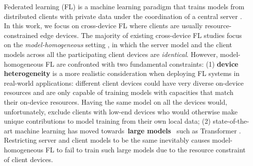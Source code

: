 \documentclass{article}
\begin{document}
Federated learning (FL) is a machine learning paradigm that trains models from distributed clients with private data under the coordination of a central server \cite{kairouz2021advances, wang2021field}. In this work, we focus on cross-device FL where clients are usually resource-constrained edge devices.
%
The majority of existing cross-device FL studies focus on the \textit{model-homogeneous} setting \cite{mcmahan2017communication, li2020federated, karimireddy2020scaffold, chen2020fedbe}, in which the server model and the client models across all the participating client devices are \textit{identical}. 
However, model-homogeneous FL are confronted with two fundamental constraints:
%
(1) \textbf{device heterogeneity} is a more realistic consideration when deploying FL systems in real-world applications: different client devices could have very diverse on-device resources and are only capable of training models with capacities that match their on-device resources. Having the same model on all the devices would, unfortunately, exclude clients with low-end devices who would otherwise make unique contributions to model training from their own local data;
%
(2) state-of-the-art machine learning has moved towards~\textbf{large models}~\cite{bommasani2021opportunities} such as Transformer \cite{vaswani2017attention}. Restricting server and client models to be the same inevitably causes model-homogeneous FL to fail to train such large models due to the resource constraint of client devices.
\end{document}
